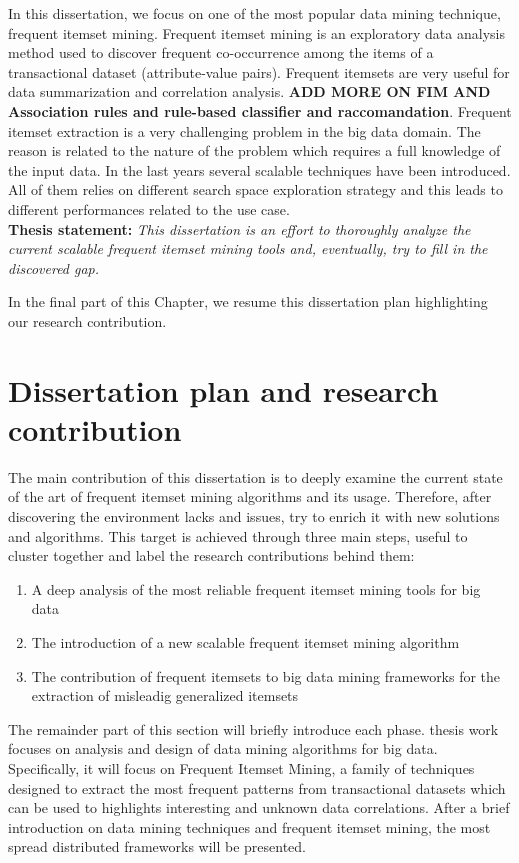 In this dissertation, we focus on one of the most popular data mining technique, frequent itemset mining. Frequent itemset mining is an exploratory data analysis method used to discover frequent co-occurrence among the items of a transactional dataset (attribute-value pairs). Frequent itemsets are very useful for data summarization and correlation analysis. \textbf{ADD MORE ON FIM AND Association rules and rule-based classifier and raccomandation}.
Frequent itemset extraction is a very challenging problem in the big data domain. The reason is related to the nature of the problem which requires a full knowledge of the input data. In the last years several scalable techniques have been introduced. All of them relies on different search space exploration strategy and this leads to different performances related to the use case. 
\\

\textbf{Thesis statement: }\textit{This dissertation is an effort to thoroughly analyze the current scalable frequent itemset mining tools and, eventually, try to fill in the discovered gap.}

In the final part of this Chapter, we resume this dissertation plan highlighting our research contribution.

\section{Dissertation plan and research contribution}
The main contribution of this dissertation is to deeply examine the current state of the art of frequent itemset mining algorithms and its usage. Therefore, after discovering the environment lacks and issues, try to enrich it with new solutions and algorithms. 
This target is achieved through three main steps, useful to cluster together and label the research contributions behind them:
\begin{enumerate}
\item A deep analysis of the most reliable frequent itemset mining tools for big data
\item The introduction of a new scalable frequent itemset mining algorithm
\item The contribution of frequent itemsets to big data mining frameworks for the extraction of misleadig generalized itemsets
\end{enumerate}
The remainder part of this section will briefly introduce each phase. thesis work focuses on analysis and design of data mining algorithms for big data. Specifically, it will focus on Frequent Itemset Mining, a family of techniques designed to extract the most frequent patterns from transactional datasets which can be used to highlights interesting and unknown data correlations.
After a brief introduction on data mining techniques and frequent itemset mining, the most spread distributed frameworks will be presented.


